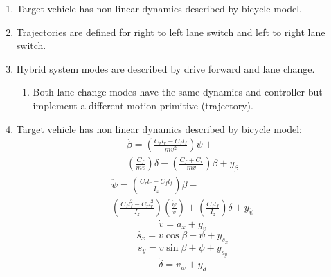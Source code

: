 \begin{enumerate}
	\item Target vehicle has non linear dynamics described by bicycle model.
	\item Trajectories are defined for right to left lane switch and left to right lane switch.
	\item Hybrid system modes are described by drive forward and lane change.
	\begin{enumerate}
		\item Both lane change modes have the same dynamics and controller but implement a different motion primitive (trajectory).
	\end{enumerate}
	\item Target vehicle has non linear dynamics described by bicycle model:
	\begin{equation}
	\begin{aligned}
	\ddot{\beta}=\left(\frac{C_rl_r-C_fl_f}{mv^2} \right)\dot{\psi}+\\
	\left(\frac{C_f}{mv} \right)\delta-\left(\frac{C_f+C_r}{mv} \right)\beta+y_{\beta}
	\end{aligned}
	\end{equation}
	\begin{equation}
	\begin{aligned}
	\ddot{\psi}=\left(\frac{C_rl_r-C_fl_f}{I_z} \right)\beta-\\
	\left(\frac{C_fl_f^2-C_rl_r^2}{I_z} \right)\left(\frac{\dot{\psi}}{v} \right)+
	\left(\frac{C_fl_f}{I_z} \right)\delta+y_{\dot{\psi}}
	\end{aligned}
	\end{equation}
	\begin{equation}
	\dot{v}=a_x+y_v
	\end{equation}
	\begin{equation}
	\dot{s_x}=v\cos{\beta+\psi}+y_{s_x}
	\end{equation}
	\begin{equation}
	\dot{s_y}=v\sin{\beta+\psi}+y_{s_y}
	\end{equation}
	\begin{equation}
	\dot{\delta}=v_w+y_d
	\end{equation}
	

\end{enumerate}
